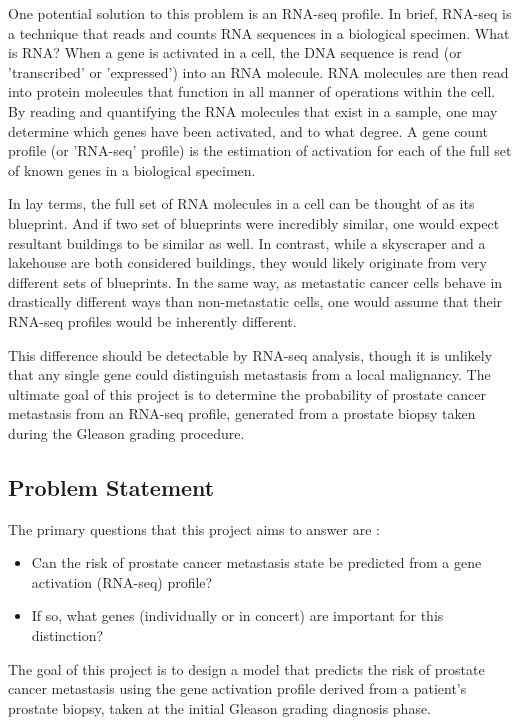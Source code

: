 \documentclass[final]{article}
\begin{document}
One potential solution to this problem is an RNA-seq profile.  In brief, RNA-seq
is a technique that reads and counts RNA sequences in a biological specimen.
What is RNA?  When a gene is activated in a cell, the DNA sequence is read (or
'transcribed' or 'expressed') into an RNA molecule.  RNA molecules are then read
into protein molecules that function in all manner of operations within the
cell.  By reading and quantifying the  RNA molecules that exist in a sample, one
may determine which genes have been activated, and to what degree.  A gene count
profile (or 'RNA-seq' profile) is the estimation of activation for each of the
full set of known genes in a biological specimen.

In lay terms, the full set of RNA molecules in a cell can be  thought of as its
blueprint.  And if two set of blueprints were incredibly similar, one would
expect resultant buildings to be similar as well.  In contrast, while a
skyscraper and a lakehouse are both considered buildings, they would likely
originate from very different sets of blueprints.  In the same way, as
metastatic cancer cells behave in drastically  different ways than
non-metastatic cells, one would assume that their RNA-seq profiles would be
inherently different.

This difference should be detectable by RNA-seq analysis, though it is unlikely
that any single gene could distinguish metastasis from a local malignancy. The
ultimate goal of this project is to determine the probability of prostate cancer
metastasis from an RNA-seq profile, generated from a prostate biopsy taken
during the Gleason grading procedure.

\subsection{Problem Statement}

The primary questions that this project aims to answer are :
\begin{itemize}
\item Can the risk of prostate cancer metastasis state be predicted from a gene activation (RNA-seq) profile?
\item If so, what genes (individually or in concert) are important for this distinction?
\end{itemize}

The goal of this project is to design a model that predicts the risk of prostate
cancer metastasis using the gene activation profile derived from a patient's
prostate biopsy, taken at the initial Gleason grading diagnosis phase.
\end{document}
